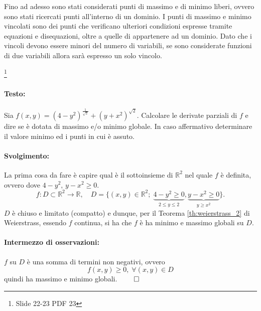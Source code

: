 Fino ad adesso sono stati considerati punti di massimo e di minimo liberi, ovvero sono stati ricercati punti all'interno di un dominio. I punti di massimo e minimo vincolati sono dei punti che verificano ulteriori condizioni espresse tramite equazioni e disequazioni, oltre a quelle di appartenere ad un dominio. Dato che i vincoli devono essere minori del numero di variabili, se sono considerate funzioni di due variabili allora sarà espresso un solo vincolo.

\begin{example}
	\footnote{Slide 22-23 PDF 23}
	\leavevmode\paragraph{Testo:} Sia $f(x,y)=(4-y^2)^{\frac{1}{\sqrt{2}}} + (y+x^2)^{\sqrt{2}}$. Calcolare le derivate parziali di $f$ e dire se è dotata di massimo e/o minimo globale. In caso affermativo determinare il valore minimo ed i punti in cui è assuto.
	\paragraph{Svolgimento:}
	La prima cosa da fare è capire qual è il sottoinsieme di $\mathbb{R}^2$ nel quale $f$ è definita, ovvero dove $4-y^2,\, y-x^2 \geq 0$.\\
	\begin{equation*}
		f:D\subset \mathbb{R}^2\rightarrow \mathbb{R},\quad D=\{(x,y)\in\mathbb{R}^2;\; \underbrace{4-y^2\geq 0}_{2\leq y\leq 2}, \underbrace{y-x^2\geq 0}_{y\geq x^2}\}.
	\end{equation*}
	$D$ è chiuso e limitato (compatto) e dunque, per il Teorema \ref{th:weierstrass_2} di Weierstrass, essendo $f$ continua, si ha che $f$ è ha minimo e massimo globali su $D$.
	\paragraph{Intermezzo di osservazioni:} $f$ su $D$ è una somma di termini non negativi, ovvero
	\begin{equation*}
		f(x,y)\geq 0,\; \forall (x,y)\in D
	\end{equation*}
	quindi ha massimo e minimo globali. $\qed$\\
	

\end{example}
